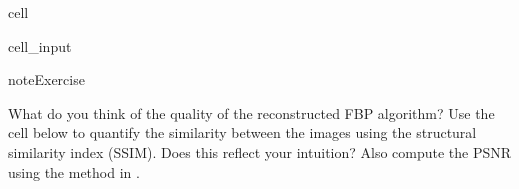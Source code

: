 \documentclass[letterpaper,10pt,english]{jupyterBook}
\begin{document}
\begin{sphinxuseclass}{cell}
\begin{sphinxVerbatimInput}
\begin{sphinxuseclass}{cell_input}
\begin{sphinxVerbatim}[commandchars=\\\{\}]
\PYG{p}{[}\PYG{p}{]}
\PYG{p}{[}\PYG{p}{]}
\PYG{p}{[}\PYG{p}{]}
\end{sphinxVerbatim}

\end{sphinxuseclass}\end{sphinxVerbatimInput}

\end{sphinxuseclass}
\begin{sphinxadmonition}{note}{Exercise}

\sphinxAtStartPar
What do you think of the quality of the reconstructed FBP algorithm? Use the cell below to quantify the similarity between the images using the structural similarity index (SSIM). Does this reflect your intuition? Also compute the PSNR using the  method in .
\end{sphinxadmonition}
\end{document}
